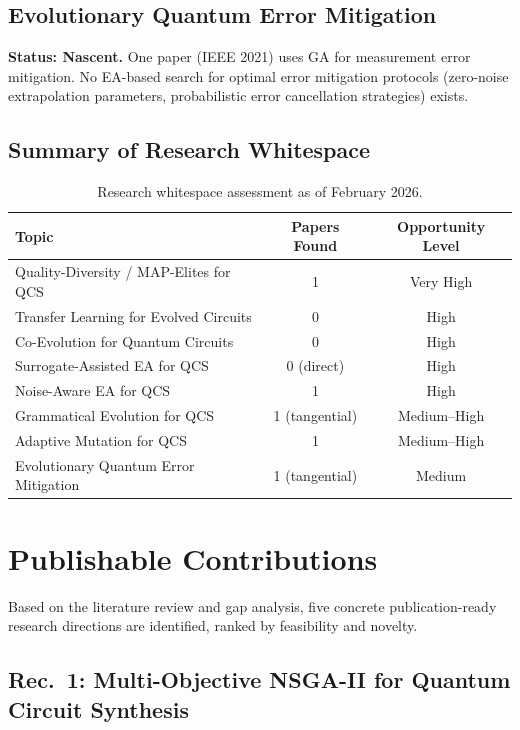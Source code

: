 \documentclass[11pt]{article}
\begin{document}
\subsection{Evolutionary Quantum Error Mitigation}
\textbf{Status: Nascent.}
One paper (IEEE 2021) uses GA for measurement error mitigation. No EA-based search for optimal error mitigation protocols (zero-noise extrapolation parameters, probabilistic error cancellation strategies) exists.

\subsection{Summary of Research Whitespace}

\begin{table}[h]
\centering
\begin{tabular}{lcc}
\toprule
\textbf{Topic} & \textbf{Papers Found} & \textbf{Opportunity Level} \\
\midrule
Quality-Diversity / MAP-Elites for QCS & 1 & Very High \\
Transfer Learning for Evolved Circuits & 0 & High \\
Co-Evolution for Quantum Circuits & 0 & High \\
Surrogate-Assisted EA for QCS & 0 (direct) & High \\
Noise-Aware EA for QCS & 1 & High \\
Grammatical Evolution for QCS & 1 (tangential) & Medium--High \\
Adaptive Mutation for QCS & 1 & Medium--High \\
Evolutionary Quantum Error Mitigation & 1 (tangential) & Medium \\
\bottomrule
\end{tabular}
\caption{Research whitespace assessment as of February 2026.}
\label{tab:whitespace}
\end{table}

\section{Publishable Contributions}
\label{sec:contributions}

Based on the literature review and gap analysis, five concrete publication-ready research directions are identified, ranked by feasibility and novelty.

\subsection{Rec.\ 1: Multi-Objective NSGA-II for Quantum Circuit Synthesis}
\end{document}
